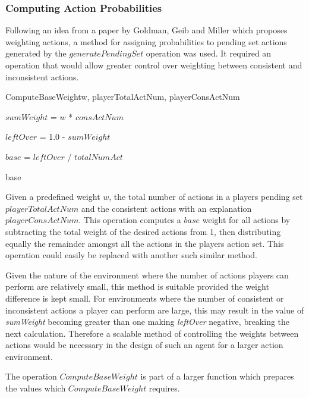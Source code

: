 \documentclass[parskip]{cs4rep}
\begin{document}
\newpage

\subsubsection{Computing Action Probabilities}

Following an idea from a paper by Goldman, Geib and Miller \cite{Goldman99anew} which proposes weighting actions, a method for assigning probabilities to pending set actions generated by the $generatePendingSet$ operation was used. It required an operation that would allow greater control over weighting between consistent and inconsistent actions.

\begin{pseudocode}[ruled]{ComputeBaseWeight}{w, playerTotalActNum, playerConsActNum}
\begin{algorithm}[H]

$sumWeight$ = $w$ * $consActNum$

$leftOver$ = 1.0 - $sumWeight$

$base$ = $leftOver$ / $totalNumAct$

\Return base
\end{algorithm}
\end{pseudocode}

Given a predefined weight $w$, the total number of actions in a players pending set $playerTotalActNum$ and the consistent actions with an explanation $playerConsActNum$. This operation computes a $base$ weight for all actions by subtracting the total weight of the desired actions from 1, then distributing equally the remainder amongst all the actions in the players action set. This operation could easily be replaced with another such similar method.

Given the nature of the environment where the number of actions players can perform are relatively small, this method is suitable provided the weight difference is kept small. For environments where the number of consistent or inconsistent actions a player can perform are large, this may result in the value of \textit{sumWeight} becoming greater than one making \textit{leftOver} negative, breaking the next calculation. Therefore a scalable method of controlling the weights between actions would be necessary in the design of such an agent for a larger action environment.

The operation $ComputeBaseWeight$ is part of a larger function which prepares the values which $ComputeBaseWeight$ requires.
\end{document}
